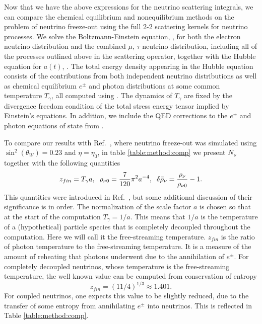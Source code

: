 Now that we have the above expressions for the neutrino scattering integrals, we can compare the chemical equilibrium and nonequilibrium methods on the problem of neutrino freeze-out using the full $2$-$2$ scattering kernels for neutrino processes.  We solve the Boltzmann-Einstein equation, , for both the electron neutrino distribution and the combined $\mu$, $\tau$ neutrino distribution, including all of the  processes outlined above in the scattering operator, together with the Hubble equation for $a(t)$, .  The total energy density  appearing in the Hubble equation consists of the contributions from both independent neutrino distributions as well as chemical equilibrium $e^\pm$ and photon distributions at some common temperature $T_\gamma$, all computed using .  The dynamics of $T_\gamma$ are fixed by the divergence freedom condition of the total stress energy tensor implied by Einstein's equations.  In addition, we include the QED corrections to the $e^\pm$ and photon equations of state from  .%

To compare our results with Ref.~\cite{Mangano:2005cc}, where neutrino freeze-out was simulated using $\sin^2(\theta_W)=0.23$ and $\eta=\eta_0$, in table \ref{table:method:comp} we present $N_\nu$ together with the following quantities
\begin{align}
 z_{fin}=T_\gamma a,\hspace{2mm}  \rho_{\nu 0}=\frac{7}{120}\pi^2a^{-4}, \hspace{2mm}  \delta\bar\rho_{\nu}= \frac{\rho_\nu}{\rho_{\nu 0}}-1.
\end{align}
This quantities were introduced in Ref.~\cite{Mangano:2005cc}, but some additional discussion of their significance is in order.  The normalization of the scale factor $a$ is chosen so that at the start of the computation $T_\gamma=1/a$.  This means that $1/a$ is the temperature of a (hypothetical) particle species that is completely decoupled throughout the computation. Here we will call it the free-streaming temperature. $z_{fin}$ is the ratio of photon temperature to the free-streaming temperature.  It is a measure of the amount of reheating that photons underwent due to the annihilation of $e^\pm$.  For completely decoupled neutrinos, whose temperature is the free-streaming temperature, the well known value can be computed from conservation of entropy
\begin{equation}
z_{fin}=(11/4)^{1/3}\approx 1.401.
\end{equation}
For coupled neutrinos, one expects this value to be slightly reduced, due to the  transfer of some entropy from annihilating $e^\pm$ into neutrinos. This is reflected in Table \ref{table:method:comp}.

